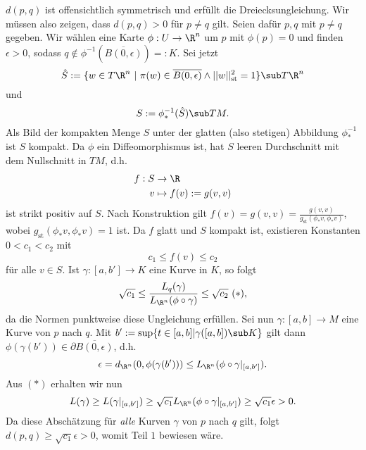 \begin{beweis}
$d(p,q)$ ist offensichtlich symmetrisch und erfüllt die Dreiecksungleichung. Wir müssen also zeigen, dass $d(p,q) > 0$ für $p \neq q$ gilt. Seien dafür $p,q$ mit $p \neq q$ gegeben. Wir wählen eine Karte $\phi: U \to \R^n$ um $p$ mit $\phi(p)=0$ und finden $\epsilon > 0$, sodass $q \notin \phi^{-1} \left(\overline{B(0,\epsilon)}\right) =: K$. Sei jetzt
\begin{equation}
\hat{S} := \{ w \in T\R^n \ | \ \pi(w) \in \overline{B(0,\epsilon)} \wedge ||w||^2_\text{st} =1 \} \sub T\R^n
\end{equation}
und 
\begin{equation}
S:= \phi^{-1}_\ast (\hat{S}) \sub TM.
\end{equation}
Als Bild der kompakten Menge $S$ unter der glatten (also stetigen) Abbildung $\phi^{-1}_\ast$ ist $S$ kompakt. Da $\phi$ ein Diffeomorphismus ist, hat $S$ leeren Durchschnitt mit dem Nullschnitt in $TM$, d.h. 
\begin{align}
f: S &\to \R \\
v &\mapsto f(v):= g(v,v)
\end{align}
ist strikt positiv auf $S$. Nach Konstruktion gilt $f(v)=g(v,v) = \frac{g(v,v)}{g_\text{st} (\phi_\ast v, \phi_\ast v)}$, wobei $g_\text{st} (\phi_\ast v, \phi_\ast v)=1$ ist. Da $f$ glatt und $S$ kompakt ist, existieren Konstanten $0<c_1<c_2$ mit
\begin{equation}
c_1 \leq f(v) \leq c_2
\end{equation}
für alle $v \in S$. 
Ist $\gamma: [a, b'] \to K$ eine Kurve in $K$, so folgt
\begin{equation}
\sqrt{c_1} \leq \frac{L_q(\gamma)}{L_{\R^n}(\phi \circ \gamma)} \leq \sqrt{c_2} \ (\ast),
\end{equation}
da die Normen punktweise diese Ungleichung erfüllen.
Sei nun $\gamma: [a,b] \to M$ eine Kurve von $p$ nach $q$. Mit $b' := \sup \{ t \in [a,b] | \gamma([a,b]) \sub K \}$ gilt dann $\phi(\gamma(b')) \in \partial \overline{B(0,\epsilon)}$, d.h.
\begin{equation}
\epsilon = d_{\R^n} (0, \phi(\gamma(b'))) \leq L_{\R^n} (\phi \circ \gamma |_{[a,b']}).
\end{equation}
Aus $(\ast)$ erhalten wir nun
\begin{equation}
L(\gamma) \geq L(\gamma|_{[a,b']}) \geq \sqrt{c_1} L_{\R^n} (\phi \circ \gamma|_{[a,b']}) \geq \sqrt{c_1} \epsilon > 0.
\end{equation}
Da diese Abschätzung für \textit{alle} Kurven $\gamma$ von $p$ nach $q$ gilt, folgt $d(p,q) \geq \sqrt{c_1} \epsilon > 0$, womit Teil $1$ bewiesen wäre.\\

\end{beweis}
